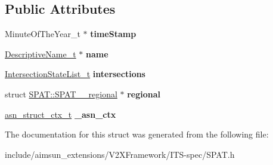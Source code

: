 \subsection*{Public Attributes}
\begin{DoxyCompactItemize}
\item 
Minute\+Of\+The\+Year\+\_\+t $\ast$ {\bfseries time\+Stamp}\hypertarget{structSPAT_a71ab45cc54b133abbdbb0fbbd5137366}{}\label{structSPAT_a71ab45cc54b133abbdbb0fbbd5137366}

\item 
\hyperlink{structOCTET__STRING}{Descriptive\+Name\+\_\+t} $\ast$ {\bfseries name}\hypertarget{structSPAT_ad0f241340bc8fedf2b65db81bee5ad1f}{}\label{structSPAT_ad0f241340bc8fedf2b65db81bee5ad1f}

\item 
\hyperlink{structIntersectionStateList}{Intersection\+State\+List\+\_\+t} {\bfseries intersections}\hypertarget{structSPAT_ad19348b61cae238c97f7f163728a9d9d}{}\label{structSPAT_ad19348b61cae238c97f7f163728a9d9d}

\item 
struct \hyperlink{structSPAT_1_1SPAT____regional}{S\+P\+A\+T\+::\+S\+P\+A\+T\+\_\+\+\_\+regional} $\ast$ {\bfseries regional}\hypertarget{structSPAT_a45f4410bcaed840d7ebff405b206c192}{}\label{structSPAT_a45f4410bcaed840d7ebff405b206c192}

\item 
\hyperlink{structasn__struct__ctx__s}{asn\+\_\+struct\+\_\+ctx\+\_\+t} {\bfseries \+\_\+asn\+\_\+ctx}\hypertarget{structSPAT_a14350e8cf6522358feb0865627a35d0e}{}\label{structSPAT_a14350e8cf6522358feb0865627a35d0e}

\end{DoxyCompactItemize}


The documentation for this struct was generated from the following file\+:\begin{DoxyCompactItemize}
\item 
include/aimsun\+\_\+extensions/\+V2\+X\+Framework/\+I\+T\+S-\/spec/S\+P\+A\+T.\+h\end{DoxyCompactItemize}
